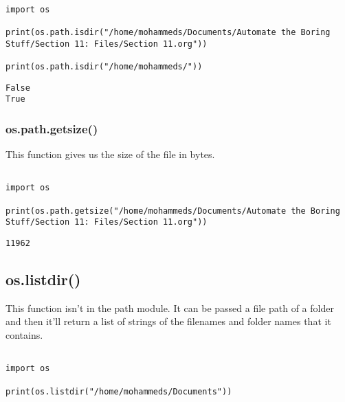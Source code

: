 \documentclass[11pt]{article}
\begin{document}
\begin{verbatim}

import os

print(os.path.isdir("/home/mohammeds/Documents/Automate the Boring Stuff/Section 11: Files/Section 11.org"))

print(os.path.isdir("/home/mohammeds/"))

\end{verbatim}

\begin{verbatim}
False
True
\end{verbatim}

\subsubsection{os.path.getsize()}
\label{sec:org80d05f3}

This function gives us the size of the file in bytes.

\begin{verbatim}

import os

print(os.path.getsize("/home/mohammeds/Documents/Automate the Boring Stuff/Section 11: Files/Section 11.org"))

\end{verbatim}

\begin{verbatim}
11962
\end{verbatim}

\subsection{os.listdir()}
\label{sec:orgdc23507}

This function isn't in the path module. It can be passed a file path of a folder and then it'll return a list of strings of the filenames and folder names that it contains.

\begin{verbatim}

import os

print(os.listdir("/home/mohammeds/Documents"))

\end{verbatim}
\end{document}
